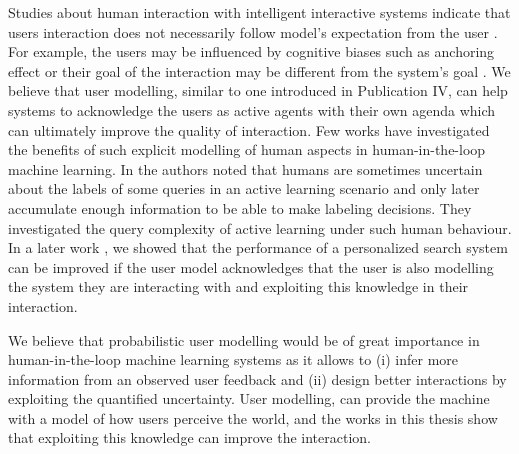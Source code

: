 \documentclass[dissertation,math,vertlayout,pdfa,colorlinks]{aaltoseries}
\begin{document}
Studies about human interaction with intelligent interactive systems indicate that users interaction does not necessarily follow model's expectation from the user \cite{OHagan06,bias_warning,Fabio2020}. For example, the users may be influenced by cognitive biases such as anchoring effect \cite{OHagan06,bias_warning} or their goal of the interaction may be different from the system's goal \cite{Fabio2020}. We believe that user modelling, similar to one introduced in Publication IV, can help systems to acknowledge the users as active agents with their own agenda which can ultimately improve the quality of interaction. Few works have investigated the benefits of such explicit modelling of human aspects in human-in-the-loop machine learning. In \cite{NIPS2016_6155} the authors noted that humans are sometimes uncertain about the labels of some queries in an active learning scenario and only later accumulate enough information to be able to make labeling decisions. They investigated the query complexity of active learning under such human behaviour. In a later work \cite{peltola2019machine}, we showed that the performance of a personalized search system can be improved if the user model acknowledges that the user is also modelling the system they are interacting with and exploiting this knowledge in their interaction. 

We believe that probabilistic user modelling would be of great importance in human-in-the-loop machine learning systems as it allows to (i) infer more information from an observed user feedback and (ii) design better interactions by exploiting the quantified uncertainty. User modelling, can provide the machine with a model of how users perceive the world, and the works in this thesis show that exploiting this knowledge can improve the interaction.

\end{document}
